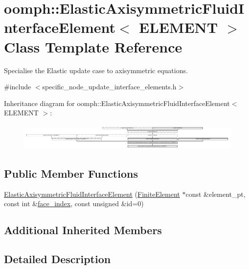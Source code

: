 \hypertarget{classoomph_1_1ElasticAxisymmetricFluidInterfaceElement}{}\section{oomph\+:\+:Elastic\+Axisymmetric\+Fluid\+Interface\+Element$<$ E\+L\+E\+M\+E\+NT $>$ Class Template Reference}
\label{classoomph_1_1ElasticAxisymmetricFluidInterfaceElement}


Specialise the Elastic update case to axisymmetric equations.  




{\ttfamily \#include $<$specific\+\_\+node\+\_\+update\+\_\+interface\+\_\+elements.\+h$>$}

Inheritance diagram for oomph\+:\+:Elastic\+Axisymmetric\+Fluid\+Interface\+Element$<$ E\+L\+E\+M\+E\+NT $>$\+:\begin{figure}[H]
\begin{center}
\leavevmode
\includegraphics[height=1.352657cm]{classoomph_1_1ElasticAxisymmetricFluidInterfaceElement}
\end{center}
\end{figure}
\subsection*{Public Member Functions}
\begin{DoxyCompactItemize}
\item 
\hyperlink{classoomph_1_1ElasticAxisymmetricFluidInterfaceElement_a9cb419f11aa4504bca4b6a9c40cca505}{Elastic\+Axisymmetric\+Fluid\+Interface\+Element} (\hyperlink{classoomph_1_1FiniteElement}{Finite\+Element} $\ast$const \&element\+\_\+pt, const int \&\hyperlink{classoomph_1_1FaceElement_a478d577ac6db67ecc80f1f02ae3ab170}{face\+\_\+index}, const unsigned \&id=0)
\end{DoxyCompactItemize}
\subsection*{Additional Inherited Members}


\subsection{Detailed Description}
